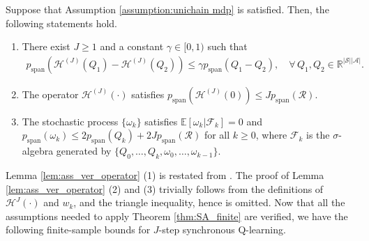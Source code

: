 \documentclass[11 pt]{article}
\begin{document}
	
	
	\begin{lemma}\label{lem:ass_ver_operator}
		Suppose that Assumption \ref{assumption:unichain mdp} is satisfied. Then, the following statements hold.
		\begin{enumerate}[(1)]
			\item There exist $J\geq 1$ and a constant $\gamma\in [0,1)$ such that
			\begin{align*}
				p_{\text{span}}(\mathcal{H}^{(J)}(Q_1)-\mathcal{H}^{(J)}(Q_2))\leq \gamma p_{\text{span}}(Q_1-Q _2),\quad \forall\,Q_1,Q_2\in\mathbb{R}^{|\mathcal{S}||\mathcal{A}|}.
			\end{align*}
			\item The operator $\mathcal{H}^{(J)}(\cdot)$ satisfies $p_{\text{span}}(\mathcal{H}^{(J)}(0))\leq Jp_{\text{span}}(\mathcal{R})$.
			\item The stochastic process $\{\omega_k\}$ satisfies $\mathbb{E}[\omega_{k}|\mathcal{F}_k]=0$ and $p_{\text{span}}(\omega_k)\leq 2p_{\text{span}}(Q_k)+2Jp_{\text{span}}(\mathcal{R})$ for all $k\geq 0$, where $\mathcal{F}_k$ is the $\sigma$-algebra generated by $\{Q_0,\dots,Q_k,\omega_0,\dots,\omega_{k-1}\}$.
		\end{enumerate}
	\end{lemma}
	
	Lemma \ref{lem:ass_ver_operator} (1) is restated from \cite[Section 8.5.4]{puterman2014markov}. The proof of Lemma \ref{lem:ass_ver_operator} (2) and (3) trivially follows from the definitions of $\mathcal{H}^J(\cdot)$ and $w_k$, and the triangle inequality, hence is omitted. Now that all the assumptions needed to apply Theorem \ref{thm:SA_finite} are verified, we have the following finite-sample bounds for $J$-step synchronous Q-learning.
	
\end{document}
